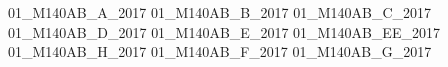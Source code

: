 \documentclass[12pt,twoside]{book}
\begin{document}
                

\newcommand{\Note}{Side Comment}
\newcommand{\Notes}{Side Comments}
\newcommand{\notes}{side comments}

\newcommand{\ThisText}{{\em This Textbook}} %
\newcommand{\TheseNotes}{{\em This Textbook}} %





\renewcommand{\thechapter}{\Roman{chapter}}



% 



             \pagestyle{headings}


               \newcommand{\Inputclude}{}




                 \Inputclude{01_M140AB_A_2017} %
                 \Inputclude{01_M140AB_B_2017} %
                 \Inputclude{01_M140AB_C_2017} %
                 \Inputclude{01_M140AB_D_2017} %
                 \Inputclude{01_M140AB_E_2017} %
                 \Inputclude{01_M140AB_EE_2017} %
                 \Inputclude{01_M140AB_H_2017} %
                 \Inputclude{01_M140AB_F_2017} %
                 \Inputclude{01_M140AB_G_2017} %
\end{document}
